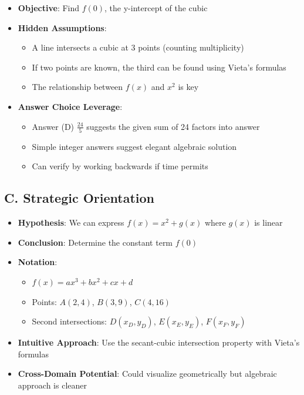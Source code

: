 \documentclass[]{article}
\begin{document}
\begin{problemconfigbox}
\begin{itemize}[leftmargin=*]
    \item \textbf{Objective}: Find $f(0)$, the y-intercept of the cubic
    
    \item \textbf{Hidden Assumptions}:
    \begin{itemize}
        \item A line intersects a cubic at 3 points (counting multiplicity)
        \item If two points are known, the third can be found using Vieta's formulas
        \item The relationship between $f(x)$ and $x^2$ is key
    \end{itemize}
    
    \item \textbf{Answer Choice Leverage}: 
    \begin{itemize}
        \item Answer (D) $\frac{24}{5}$ suggests the given sum of 24 factors into answer
        \item Simple integer answers suggest elegant algebraic solution
        \item Can verify by working backwards if time permits
    \end{itemize}
\end{itemize}

\subsection*{C. Strategic Orientation}
\begin{itemize}[leftmargin=*]
    \item \textbf{Hypothesis}: We can express $f(x) = x^2 + g(x)$ where $g(x)$ is linear
    \item \textbf{Conclusion}: Determine the constant term $f(0)$
    \item \textbf{Notation}: 
    \begin{itemize}
        \item $f(x) = ax^3 + bx^2 + cx + d$
        \item Points: $A(2,4)$, $B(3,9)$, $C(4,16)$
        \item Second intersections: $D(x_D, y_D)$, $E(x_E, y_E)$, $F(x_F, y_F)$
    \end{itemize}
    \item \textbf{Intuitive Approach}: Use the secant-cubic intersection property with Vieta's formulas
    \item \textbf{Cross-Domain Potential}: Could visualize geometrically but algebraic approach is cleaner
\end{itemize}
\end{problemconfigbox}
\end{document}

